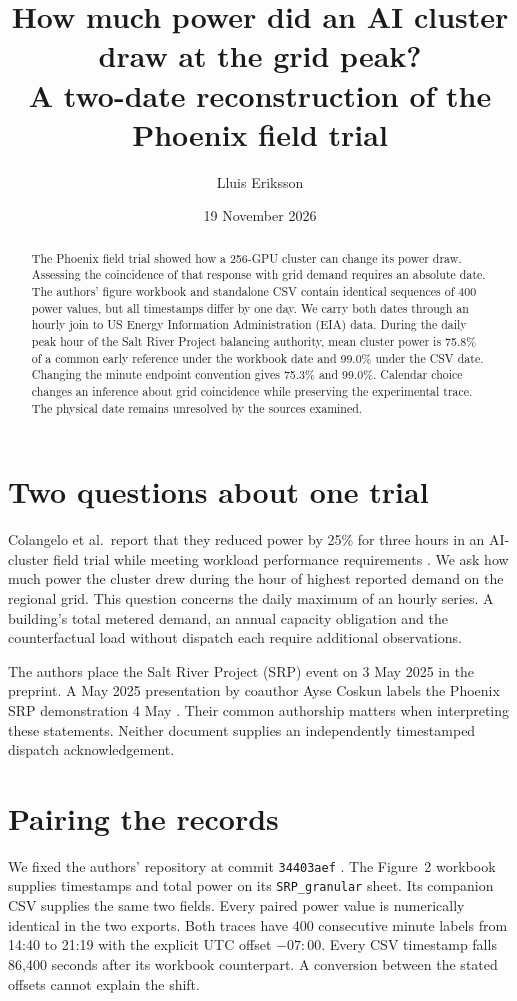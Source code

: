 \documentclass[11pt]{article}
\title{How much power did an AI cluster draw at the grid peak?\\A two-date reconstruction of the Phoenix field trial}
\author{Lluis Eriksson}
\date{19 November 2026}
\begin{document}
\maketitle
\begin{abstract}
The Phoenix field trial showed how a 256-GPU cluster can change its power draw. Assessing the coincidence of that response with grid demand requires an absolute date. The authors' figure workbook and standalone CSV contain identical sequences of 400 power values, but all timestamps differ by one day. We carry both dates through an hourly join to US Energy Information Administration (EIA) data. During the daily peak hour of the Salt River Project balancing authority, mean cluster power is 75.8\% of a common early reference under the workbook date and 99.0\% under the CSV date. Changing the minute endpoint convention gives 75.3\% and 99.0\%. Calendar choice changes an inference about grid coincidence while preserving the experimental trace. The physical date remains unresolved by the sources examined.
\end{abstract}
\section{Two questions about one trial}
Colangelo et al.\ report that they reduced power by 25\% for three hours in an AI-cluster field trial while meeting workload performance requirements \cite{study,trial}. We ask how much power the cluster drew during the hour of highest reported demand on the regional grid. This question concerns the daily maximum of an hourly series. A building's total metered demand, an annual capacity obligation and the counterfactual load without dispatch each require additional observations.

The authors place the Salt River Project (SRP) event on 3 May 2025 in the preprint. A May 2025 presentation by coauthor Ayse Coskun labels the Phoenix SRP demonstration 4 May \cite{slides}. Their common authorship matters when interpreting these statements. Neither document supplies an independently timestamped dispatch acknowledgement.

\section{Pairing the records}
We fixed the authors' repository at commit \texttt{34403aef} \cite{code}. The Figure~2 workbook supplies timestamps and total power on its \texttt{SRP\_granular} sheet. Its companion CSV supplies the same two fields. Every paired power value is numerically identical in the two exports. Both traces have 400 consecutive minute labels from 14:40 to 21:19 with the explicit UTC offset $-07{:}00$. Every CSV timestamp falls 86,400 seconds after its workbook counterpart. A conversion between the stated offsets cannot explain the shift.
\end{document}
